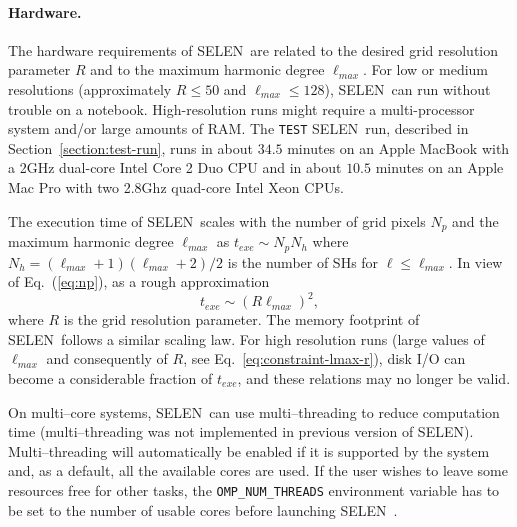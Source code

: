 \documentclass[11pt,fleqn,a4paper,titlepage]{article}
\newcommand\selen{\textsf{SELEN~}}
\newcommand\selens{\textsf{SELEN}}
\begin{document}
{%

\paragraph{Hardware.} The hardware requirements of \selen are related to the desired grid resolution parameter $R$ and to the maximum harmonic degree $\ell_{max}$. For low or medium resolutions (approximately $R \le 50$ and $\ell_{max} \le 128$), \selen can run without trouble on a notebook.  High-resolution runs might require a multi-processor system and/or large amounts of RAM.   
The \texttt{TEST} \selen run, described in Section~\ref{section:test-run}, runs in about $34.5$ minutes on an Apple MacBook with a 2GHz dual-core Intel Core 2 Duo CPU and in about $10.5$ minutes on an Apple Mac Pro with two 2.8Ghz quad-core Intel Xeon CPUs.

The execution time of \selen scales with the number of grid pixels $N_p$ and the maximum harmonic degree $\ell_{max}$ as $t_{exe} \sim N_p N_h$ where
$N_h = {(\ell_{max}+1) (\ell_{max}+2)}/{2}$ is the number of SHs for $\ell\le \ell_{max}$. In view of Eq.~(\ref{eq:np}), as a rough approximation
\begin{equation}
t_{exe} \sim \left(R \ell_{max}\right)^2, 
\end{equation} 
where $R$ is the grid resolution parameter. The memory footprint of \selen follows a similar scaling law. For high resolution runs (large values of $\ell_{max}$ and consequently of $R$, see Eq.~\ref{eq:constraint-lmax-r}), disk I/O can become a considerable fraction of $t_{exe}$, and these relations may no longer be valid. 

On multi--core systems, \selen can use multi--threading to reduce computation time (multi--threading was not implemented in previous version of \selens). Multi--threading will automatically be enabled if it is supported by the system and, as a default, all the available cores are used. If the user wishes to leave some resources free for other tasks, the \texttt{OMP\_NUM\_THREADS} environment variable has to be set to the number of usable cores before launching \selen.

}
\end{document}
